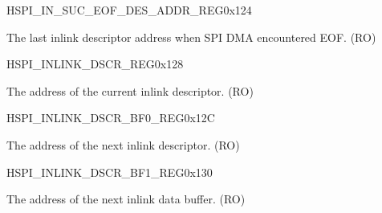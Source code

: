 \begin{register}{H}{SPI\_IN\_SUC\_EOF\_DES\_ADDR\_REG}{0x124}\label{regdesc:SPIINSUCEOFDESADDRREG}
%
\regnewline%
\begin{regdesc}\begin{reglist}
\item [SPI\_IN\_SUC\_EOF\_DES\_ADDR\_REG]The last inlink descriptor address when SPI DMA encountered EOF. (RO)
\end{reglist}\end{regdesc}
\end{register}


\begin{register}{H}{SPI\_INLINK\_DSCR\_REG}{0x128}\label{regdesc:SPIINLINKDSCRREG}
%
\regnewline%
\begin{regdesc}\begin{reglist}
\item [SPI\_INLINK\_DSCR\_REG]The address of the current inlink descriptor. (RO)
\end{reglist}\end{regdesc}
\end{register}


\begin{register}{H}{SPI\_INLINK\_DSCR\_BF0\_REG}{0x12C}\label{regdesc:SPIINLINKDSCRBF0REG}
%
\regnewline%
\begin{regdesc}\begin{reglist}
\item [SPI\_INLINK\_DSCR\_BF0\_REG]The address of the next inlink descriptor. (RO)
\end{reglist}\end{regdesc}
\end{register}


\begin{register}{H}{SPI\_INLINK\_DSCR\_BF1\_REG}{0x130}\label{regdesc:SPIINLINKDSCRBF1REG}
%
\regnewline%
\begin{regdesc}\begin{reglist}
\item [SPI\_INLINK\_DSCR\_BF1\_REG]The address of the next inlink data buffer. (RO)
\end{reglist}\end{regdesc}
\end{register}


